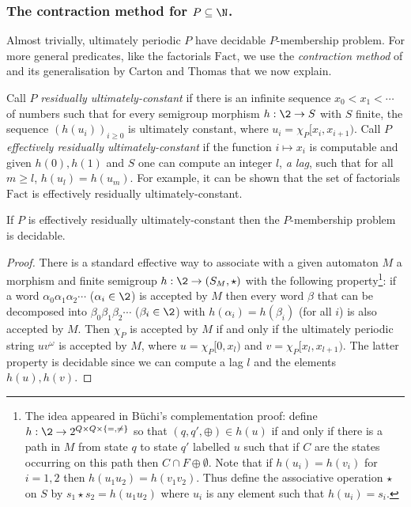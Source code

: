 \subsubsection*{The contraction method for $P \subseteq \N$.}
Almost trivially, ultimately periodic $P$ have decidable $P$-membership problem.
For more general predicates, like the factorials $\mathrm{Fact}$, we use the {\em contraction method} of \cite{ElRa66}
and its generalisation by Carton and Thomas \cite{CaTo02} that we now explain.

Call $P$  {\em residually ultimately-constant} if there is an infinite sequence $x_0 < x_1 < \cdots$ of numbers such that
for every semigroup morphism $h:\2 \to S$ with $S$ finite, the sequence $(h(u_i))_{i \geq 0}$ is ultimately constant,
where $u_i = \chi_P[x_i,x_{i+1})$.
Call $P$ {\em effectively residually ultimately-constant} if the function $i \mapsto x_i$ is computable and given $h(0),h(1)$ and $S$ one can compute an integer $l$, {\em a lag}, such that for all $m \geq l$, $h(u_l) = h(u_m)$. For example, it can be shown that the set of factorials $\textrm{Fact}$ is effectively residually ultimately-constant.

\begin{proposition} \cite{CaTo02}
If $P$ is effectively residually ultimately-constant then the $P$-membership problem is decidable.
\end{proposition}

\begin{proof}
There is a standard effective way to associate with a given automaton $M$ a morphism and finite semigroup $h:\2 \to (S_M,\star)$ with the following property\footnote{The idea appeared in B\"uchi's complementation proof: define $h:\2 \to 2^{Q \times Q \times \{=,\neq\}}$ so that $(q,q',\oplus) \in h(u)$ if
and only if there is a path in $M$ from state $q$ to state $q'$ labelled $u$ such that if $C$ are the states occurring on this path then $C \cap F \oplus \emptyset $. Note that if $h(u_i) = h(v_i)$ for $i = 1,2$ then $h(u_1u_2) = h(v_1v_2)$. Thus define the associative operation $\star$ on $S$ by
$s_1 \star  s_2 = h(u_1u_2)$ where $u_i$ is any element such that $h(u_i) = s_i$.
}: if a word $\alpha_0\alpha_1\alpha_2\cdots$ ($\alpha_i \in \2$) is accepted by $M$
then every word $\beta$ that can be decomposed into $\beta_0\beta_1\beta_2\cdots$ ($\beta_i \in \2$) with $h(\alpha_i)=h(\beta_i)$ (for all $i$) is also accepted by $M$.
Then $\chi_P$ is accepted by $M$ if and only if
the ultimately periodic string $uv^\omega$ is accepted by $M$, where $u = \chi_P[0,x_l)$ and $v = \chi_P[x_l,x_{l+1})$. The latter property is decidable since we can compute a lag $l$ and the elements $h(u),h(v)$.
\end{proof}

